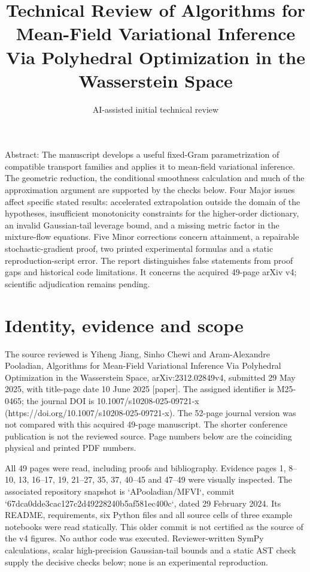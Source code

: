 \documentclass[10pt]{article}
\title{Technical Review of
Algorithms for Mean-Field Variational Inference Via Polyhedral Optimization in the Wasserstein Space}
\author{AI-assisted initial technical review}
\date{}
\begin{document}
\maketitle
Abstract: The manuscript develops a useful fixed-Gram parametrization of compatible transport families and applies it to mean-field variational inference. The geometric reduction, the conditional smoothness calculation and much of the approximation argument are supported by the checks below. Four Major issues affect specific stated results: accelerated extrapolation outside the domain of the hypotheses, insufficient monotonicity constraints for the higher-order dictionary, an invalid Gaussian-tail leverage bound, and a missing metric factor in the mixture-flow equations. Five Minor corrections concern attainment, a repairable stochastic-gradient proof, two printed experimental formulas and a static reproduction-script error. The report distinguishes false statements from proof gaps and historical code limitations. It concerns the acquired 49-page arXiv v4; scientific adjudication remains pending.\par
\section*{Identity, evidence and scope}
The source reviewed is Yiheng Jiang, Sinho Chewi and Aram-Alexandre Pooladian, Algorithms for Mean-Field Variational Inference Via Polyhedral Optimization in the Wasserstein Space, arXiv:2312.02849v4, submitted 29 May 2025, with title-page date 10 June 2025 [paper]. The assigned identifier is M25-0465; the journal DOI is 10.1007/s10208-025-09721-x (https://doi.org/10.1007/s10208-025-09721-x). The 52-page journal version was not compared with this acquired 49-page manuscript. The shorter conference publication is not the reviewed source. Page numbers below are the coinciding physical and printed PDF numbers.\par
All 49 pages were read, including proofs and bibliography. Evidence pages 1, 8–10, 13, 16–17, 19, 21–27, 35, 37, 40–45 and 47–49 were visually inspected. The associated repository snapshot is `APooladian/MFVI`, commit `67dca0dde3cac127c2d49228240b5af581ec400c`, dated 29 February 2024. Its README, requirements, six Python files and all source cells of three example notebooks were read statically. This older commit is not certified as the source of the v4 figures. No author code was executed. Reviewer-written SymPy calculations, scalar high-precision Gaussian-tail bounds and a static AST check supply the decisive checks below; none is an experimental reproduction.\par
\end{document}
